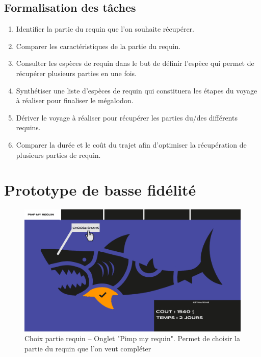 \documentclass{article}
\begin{document}
\subsection{Formalisation des tâches}
\begin{enumerate}
	\item Identifier la partie du requin que l’on souhaite récupérer.
	\item Comparer les caractéristiques de la partie du requin.
	\item Consulter les espèces de requin dans le but de définir l’espèce qui permet de récupérer plusieurs parties en une fois.
	\item Synthétiser une liste d’espèces de requin qui constituera les étapes du voyage à réaliser pour finaliser le mégalodon.
	\item Dériver le voyage à réaliser pour récupérer les parties du/des différents requins.
	\item Comparer la durée et le coût du trajet afin d’optimiser la récupération de plusieurs parties de requin.
\end{enumerate}


\newpage
\section{Prototype de basse fidélité}

\begin{figure}[!h]
	\centering
	\includegraphics[width=14.4cm]{assets/prototype/basse/onglet1}
	\caption{Choix partie requin – Onglet "Pimp my requin". Permet de choisir la partie du requin que l'on veut compléter}
    \label{onglet1} 
\end{figure}

\vspace{0.3cm}
\end{document}

